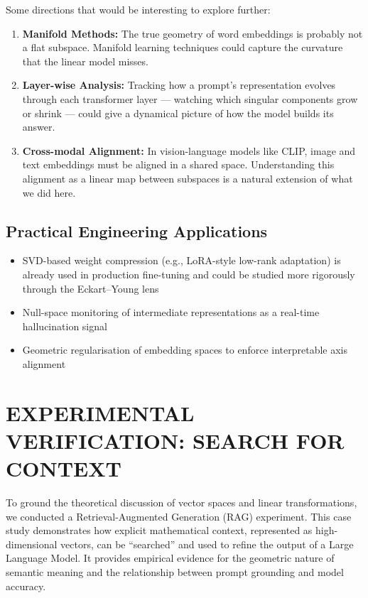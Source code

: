 \documentclass[12pt,a4paper]{article}
\begin{document}
Some directions that would be interesting to explore further:

\begin{enumerate}[label=\arabic*., itemsep=6pt]
    \item \textbf{Manifold Methods:} The true geometry of word embeddings is probably not
          a flat subspace. Manifold learning techniques could capture the curvature that
          the linear model misses.

    \item \textbf{Layer-wise Analysis:} Tracking how a prompt's representation evolves
          through each transformer layer --- watching which singular components grow or
          shrink --- could give a dynamical picture of how the model builds its answer.

    \item \textbf{Cross-modal Alignment:} In vision-language models like CLIP, image and
          text embeddings must be aligned in a shared space. Understanding this alignment
          as a linear map between subspaces is a natural extension of what we did here.
\end{enumerate}

\subsection{Practical Engineering Applications}

\begin{itemize}[itemsep=4pt]
    \item SVD-based weight compression (e.g., LoRA-style low-rank adaptation) is already
          used in production fine-tuning and could be studied more rigorously through the
          Eckart--Young lens
    \item Null-space monitoring of intermediate representations as a real-time hallucination
          signal
    \item Geometric regularisation of embedding spaces to enforce interpretable axis
          alignment
\end{itemize}

\newpage
\section{EXPERIMENTAL VERIFICATION: SEARCH FOR CONTEXT}

To ground the theoretical discussion of vector spaces and linear transformations, we conducted a Retrieval-Augmented Generation (RAG) experiment. This case study demonstrates how explicit mathematical context, represented as high-dimensional vectors, can be ``searched'' and used to refine the output of a Large Language Model. It provides empirical evidence for the geometric nature of semantic meaning and the relationship between prompt grounding and model accuracy.
\end{document}
